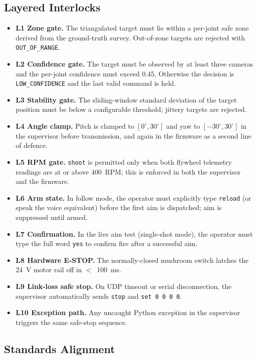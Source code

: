 \subsection{Layered Interlocks}

\begin{itemize}
    \item \textbf{L1 Zone gate.} The triangulated target must lie within a per-joint safe zone derived from the ground-truth survey. Out-of-zone targets are rejected with \texttt{OUT\_OF\_RANGE}.
    \item \textbf{L2 Confidence gate.} The target must be observed by at least three cameras and the per-joint confidence must exceed 0.45. Otherwise the decision is \texttt{LOW\_CONFIDENCE} and the last valid command is held.
    \item \textbf{L3 Stability gate.} The sliding-window standard deviation of the target position must be below a configurable threshold; jittery targets are rejected.
    \item \textbf{L4 Angle clamp.} Pitch is clamped to $[0^\circ, 30^\circ]$ and yaw to $[-30^\circ, 30^\circ]$ in the supervisor before transmission, and again in the firmware as a second line of defence.
    \item \textbf{L5 RPM gate.} \texttt{shoot} is permitted only when both flywheel telemetry readings are at or above 400~RPM; this is enforced in both the supervisor and the firmware.
    \item \textbf{L6 Arm state.} In follow mode, the operator must explicitly type \texttt{reload} (or speak the voice equivalent) before the first aim is dispatched; aim is suppressed until armed.
    \item \textbf{L7 Confirmation.} In the live aim test (single-shot mode), the operator must type the full word \texttt{yes} to confirm fire after a successful aim.
    \item \textbf{L8 Hardware E-STOP.} The normally-closed mushroom switch latches the 24~V motor rail off in $<$~100~ms.
    \item \textbf{L9 Link-loss safe stop.} On UDP timeout or serial disconnection, the supervisor automatically sends \texttt{stop} and \texttt{set 0 0 0 0}.
    \item \textbf{L10 Exception path.} Any uncaught Python exception in the supervisor triggers the same safe-stop sequence.
\end{itemize}

\subsection{Standards Alignment}

